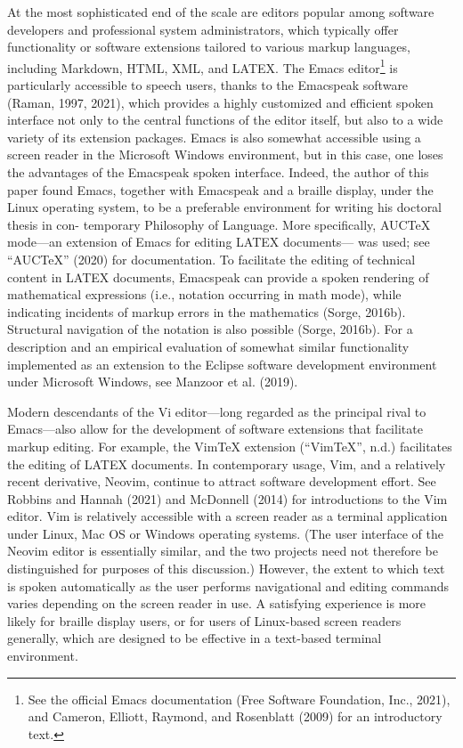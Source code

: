 \documentclass[11pt]{sig-alternate}
\begin{document}
\begin{large}
At the most sophisticated end of the scale are editors popular among software developers and professional system administrators, which typically offer functionality or software extensions tailored to various markup languages, including Markdown, HTML, XML, and LATEX. The Emacs editor\footnote{See the official Emacs documentation (Free Software Foundation, Inc., 2021), and Cameron, Elliott, Raymond, and Rosenblatt (2009) for an introductory text.} is particularly accessible to speech users, thanks to the Emacspeak software (Raman, 1997, 2021), which provides a highly customized and efficient spoken interface not only to the central functions of the editor itself, but also to a wide variety of its extension packages. Emacs is also somewhat accessible using a screen reader in the Microsoft Windows environment, but in this case, one loses the advantages of the Emacspeak spoken interface. Indeed, the author of this paper found Emacs, together with Emacspeak and a braille display, under the Linux operating system, to be a preferable environment for writing his doctoral thesis in con- temporary Philosophy of Language. More specifically, AUCTeX mode—an extension of Emacs for editing LATEX documents— was used; see “AUCTeX” (2020) for documentation. To facilitate the editing of technical content in LATEX documents, Emacspeak can provide a spoken rendering of mathematical expressions (i.e., notation occurring in math mode), while indicating incidents of markup errors in the mathematics (Sorge, 2016b). Structural navigation of the notation is also possible (Sorge, 2016b). For a description and an empirical evaluation of somewhat similar functionality implemented as an extension to the Eclipse software development environment under Microsoft Windows, see Manzoor et al. (2019).

Modern descendants of the Vi editor—long regarded as the principal rival to Emacs—also allow for the development of software extensions that facilitate markup editing. For example, the VimTeX extension (“VimTeX”, n.d.) facilitates the editing of LATEX documents. In contemporary usage, Vim, and a relatively recent derivative, Neovim, continue to attract software development effort. See Robbins and Hannah (2021) and McDonnell (2014) for introductions to the Vim editor. Vim is relatively accessible with a screen reader as a terminal application under Linux, Mac OS or Windows operating systems. (The user interface of the Neovim editor is essentially similar, and the two projects need not therefore be distinguished for purposes of this discussion.) However, the extent to which text is spoken automatically as the user performs navigational and editing commands varies depending on the screen reader in use. A satisfying experience is more likely for braille display users, or for users of Linux-based screen readers generally, which are designed to be effective in a text-based terminal environment.


\end{large}
\end{document}
